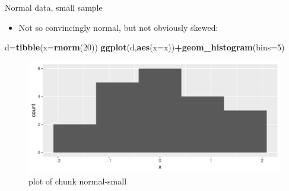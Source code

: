 \documentclass[ignorenonframetext,]{beamer}
\newenvironment{Shaded}{\begin{snugshade}}{\end{snugshade}}
\newcommand{\DataTypeTok}[1]{\textcolor[rgb]{0.13,0.29,0.53}{#1}}
\newcommand{\DecValTok}[1]{\textcolor[rgb]{0.00,0.00,0.81}{#1}}
\newcommand{\KeywordTok}[1]{\textcolor[rgb]{0.13,0.29,0.53}{\textbf{#1}}}
\newcommand{\NormalTok}[1]{#1}
\newcommand{\OperatorTok}[1]{\textcolor[rgb]{0.81,0.36,0.00}{\textbf{#1}}}
\providecommand{\tightlist}{%
  \setlength{\itemsep}{0pt}\setlength{\parskip}{0pt}}
\begin{document}
\begin{frame}[fragile]{Normal data, small sample}
\protect\hypertarget{normal-data-small-sample}{}

\begin{itemize}
\tightlist
\item
  Not so convincingly normal, but not obviously skewed:
\end{itemize}

\begin{Shaded}
\begin{Highlighting}[]
\NormalTok{d=}\KeywordTok{tibble}\NormalTok{(}\DataTypeTok{x=}\KeywordTok{rnorm}\NormalTok{(}\DecValTok{20}\NormalTok{))}
\KeywordTok{ggplot}\NormalTok{(d,}\KeywordTok{aes}\NormalTok{(}\DataTypeTok{x=}\NormalTok{x))}\OperatorTok{+}\KeywordTok{geom_histogram}\NormalTok{(}\DataTypeTok{bins=}\DecValTok{5}\NormalTok{)}
\end{Highlighting}
\end{Shaded}

\begin{figure}
\centering
\includegraphics{figure/normal-small-1.pdf}
\caption{plot of chunk normal-small}
\end{figure}

\end{frame}
\end{document}
